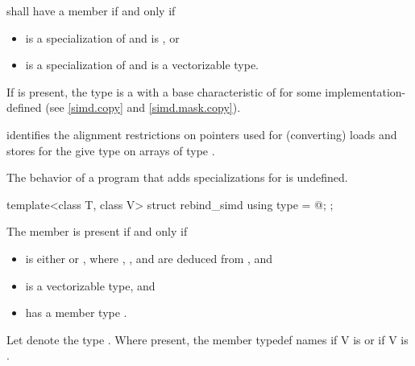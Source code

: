 \begin{itemdescr}
\pnum
{} shall have a member  if and only if
\begin{itemize}
  \item {} is a specialization of  and  is , or
  \item {} is a specialization of  and  is a vectorizable type.
\end{itemize}

\pnum
If  is present, the type  is a  with a base characteristic of  for some implementation-defined  (see \ref{simd.copy} and \ref{simd.mask.copy}). \begin{note} identifies the alignment restrictions on pointers used for (converting) loads and stores for the give type  on arrays of type .\end{note}

\pnum
The behavior of a program that adds specializations for  is undefined.
\end{itemdescr}

\begin{itemdecl}
template<class T, class V> struct rebind_simd { using type = @\seebelow@; };
\end{itemdecl}

\begin{itemdescr}
  \pnum
  The member  is present if and only if
  \begin{itemize}
    \item {} is either  or , where , , and  are deduced from , and
    \item {} is a vectorizable type, and
    \item {} has a member type .
  \end{itemize}

  \pnum
  Let  denote the type .
  Where present, the member typedef  names
   if \tcode V is  or
   if \tcode V is .
\end{itemdescr}

